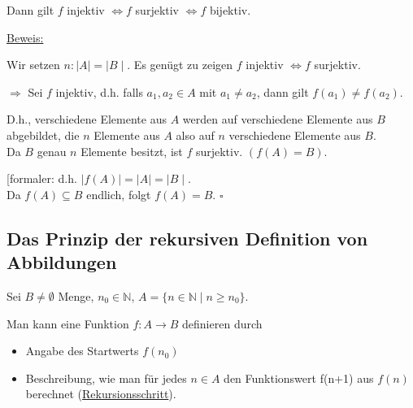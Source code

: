 \documentclass[a4paper, 12pt, twoside] {article}
\begin{document}
Dann gilt $f$ injektiv $\Leftrightarrow f$ surjektiv $\Leftrightarrow f$ bijektiv.

\underline{Beweis:}

Wir setzen $n: \mid A \mid = \mid B \mid$. Es genügt zu zeigen $f$ injektiv $\Leftrightarrow f$ surjektiv.

$\Rightarrow$ Sei $f$ injektiv, d.h. falls $a_1, a_2 \in A$ mit $a_1 \neq a_2$, dann gilt $f(a_1) \neq f(a_2)$.

D.h., verschiedene Elemente aus $A$ werden auf verschiedene Elemente aus $B$ abgebildet, die $n$ Elemente aus $A$ also auf $n$ verschiedene Elemente aus $B$. \\
Da $B$ genau $n$ Elemente besitzt, ist $f$ surjektiv. $(f(A) = B)$.

[formaler: d.h. $\mid f(A) \mid = \mid A \mid = \mid B \mid$. \\
Da $f(A) \subseteq B$ endlich, folgt $f(A) = B$. \hfill $\square$

\subsection{Das Prinzip der rekursiven Definition von Abbildungen} %

Sei $B \neq \emptyset$ Menge, $n_0 \in \mathbb{N}$, \qquad $A = \{n \in \mathbb{N} \mid n \geq n_0\}$.

Man kann eine Funktion $f: A \rightarrow B$ definieren durch
\begin{itemize}
\item Angabe des Startwerts $f(n_0)$
\item Beschreibung, wie man für jedes $n \in A$ den Funktionswert f(n+1) aus $f(n)$ berechnet (\underline{Rekursionsschritt}).
\end{itemize}
\end{document}
